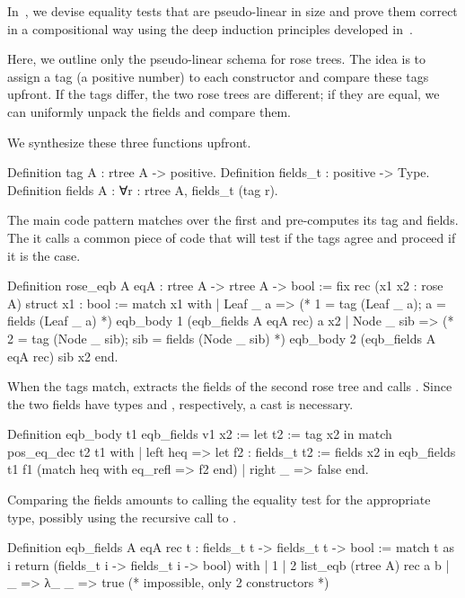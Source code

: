 \documentclass{these-ISSS}
\newenvironment{rocqcode}
  {\VerbatimEnvironment\begin{rocqbox}\begin{xrocqcode}}{\end{xrocqcode}
\end{rocqbox}}
\begin{document}
In~\cite{gregoire:hal-03800154}, we devise equality tests that are pseudo-linear
in size and prove them correct in a compositional way using the deep induction
principles developed in~\cite{tassi:hal-01897468}.

Here, we outline only the pseudo-linear schema for rose trees. The idea is to
assign a tag (a positive number) to each constructor and compare these tags
upfront. If the tags differ, the two rose trees are different; if they are
equal, we can uniformly unpack the fields and compare them.

We synthesize these three functions upfront.

\begin{rocqcode}
Definition tag A : rtree A -> positive.
Definition fields_t : positive -> Type.
Definition fields A :  ∀r : rtree A, fields_t (tag r).
\end{rocqcode}

The main code pattern matches over the first  and 
pre-computes its tag and fields. The it calls a common piece of
code  that will test if the tags agree and proceed
if it is the case.

\begin{rocqcode}
Definition rose_eqb A eqA : rtree A -> rtree A -> bool := 
  fix rec (x1 x2 : rose A) {struct x1} : bool :=
    match x1 with
    | Leaf _ a =>
        (* 1 = tag (Leaf _ a); a = fields (Leaf _ a) *)
        eqb_body 1 (eqb_fields A eqA rec) a x2
    | Node _ sib =>            
        (* 2 = tag (Node _ sib); sib = fields (Node _ sib) *)
        eqb_body 2 (eqb_fields A eqA rec) sib x2
    end.
\end{rocqcode}


When the tags match,  extracts the fields of the second rose
tree and calls . Since the two fields have types
 and , respectively, a cast is necessary.

\begin{rocqcode}
Definition eqb_body t1 eqb_fields v1 x2 :=
  let t2 := tag x2 in
  match pos_eq_dec t2 t1 with
  | left heq =>
    let f2 : fields_t t2 := fields x2 in
    eqb_fields t1 f1 (match heq with eq_refl => f2 end)
  | right _ => false
  end.
\end{rocqcode}

Comparing the fields amounts to calling the equality test for the appropriate
type, possibly using the recursive call to .

\begin{rocqcode}
Definition eqb_fields A eqA rec t :
  fields_t t -> fields_t t -> bool
:=
  match t as i return (fields_t i -> fields_t i -> bool) with
  | 1%
  | 2%
                    list_eqb (rtree A) rec a b
  | _ => λ_ _ => true (* impossible, only 2 constructors *)
\end{rocqcode}
\end{document}
